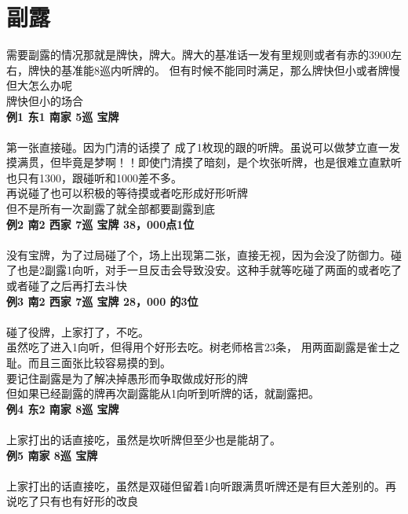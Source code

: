 \documentclass[小V的日麻笔记.tex]{subfiles}
\begin{document}
\section{副露}
需要副露的情况那就是牌快，牌大。牌大的基准话一发有里规则或者有赤的3900左右，牌快的基准能8巡内听牌的。 但有时候不能同时满足，那么牌快但小或者牌慢但大怎么办呢
\\
牌快但小的场合
\\
\textbf{例1 东1 南家 5巡 宝牌}
\\
\\
第一张直接碰。因为门清的话摸了 成了1枚现的跟的听牌。虽说可以做梦立直一发摸满贯，但毕竟是梦啊！！即使门清摸了暗刻，是个坎张听牌，也是很难立直默听也只有1300，跟碰听和1000差不多。
\\
再说碰了也可以积极的等待摸或者吃形成好形听牌
\\
但不是所有一次副露了就全部都要副露到底
\\
\textbf{例2 南2 西家 7巡 宝牌 38，000点1位}
\\
\\
没有宝牌，为了过局碰了个，场上出现第二张，直接无视，因为会没了防御力。碰了也是2副露1向听，对手一旦反击会导致没安。这种手就等吃碰了两面的或者吃了或者碰了之后再打去斗快
\\
\textbf{例3 南2 西家 7巡 宝牌 28，000 的3位}
\\
\\
碰了役牌，上家打了，不吃。
\\
虽然吃了进入1向听，但得用个好形去吃。树老师格言23条， 用两面副露是雀士之耻。而且三面张比较容易摸的到。
\\
要记住副露是为了解决掉愚形而争取做成好形的牌
\\
但如果已经副露的牌再次副露能从1向听到听牌的话，就副露把。
\\
\textbf{例4 东2 南家 8巡 宝牌}
\\
\\
上家打出的话直接吃，虽然是坎听牌但至少也是能胡了。
\\
\hrulefill
\textbf{例5 南家 8巡 宝牌}
\\
\\
上家打出的话直接吃，虽然是双碰但留着1向听跟满贯听牌还是有巨大差别的。再说吃了只有也有好形的改良
\end{document}
